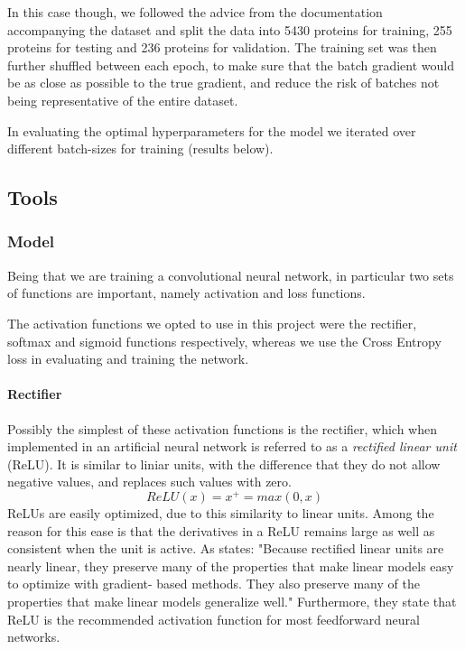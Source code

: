 \begin{multicols}{2}
In this case though, we followed the advice from the documentation accompanying the dataset and split the data into 5430 proteins for training, 255 proteins for testing and 236 proteins for validation. The training set was then further shuffled between each epoch, to make sure that the batch gradient would be as close as possible to the true gradient, and reduce the risk of batches not being representative of the entire dataset.

In evaluating the optimal hyperparameters for the model we iterated over different batch-sizes for training (results below).

\subsection{Tools}
\subsubsection{Model}
Being that we are training a convolutional neural network, in particular two sets of functions are important, namely activation and loss functions.

The activation functions we opted to use in this project were the rectifier, softmax and sigmoid functions respectively, whereas we use the Cross Entropy loss in evaluating and training the network.
\paragraph{Rectifier}
Possibly the simplest of these activation functions is the rectifier, which when implemented in an artificial 
neural network is referred to as a \textit{rectified linear unit} (ReLU). It is similar to liniar units, with the difference that they do 
not allow negative values, and replaces such values with zero.
\[
ReLU(x) = x^+ = max(0,x)
\]
ReLUs are easily optimized, due to this similarity to linear units. 
Among the reason for this ease is that the derivatives in a ReLU remains large as well as consistent when the unit is active. 
As \citeauthor{goodfellow-et-al-2016} states: "Because rectified linear units are nearly linear, they preserve many of the properties that make linear models easy to optimize with gradient-
based methods. They also preserve many of the properties that make linear models generalize well."\citep[p. 170]{goodfellow-et-al-2016} Furthermore, they state that ReLU is the recommended activation function for most feedforward neural networks\citep[p. 170]{goodfellow-et-al-2016}.


\end{multicols}
